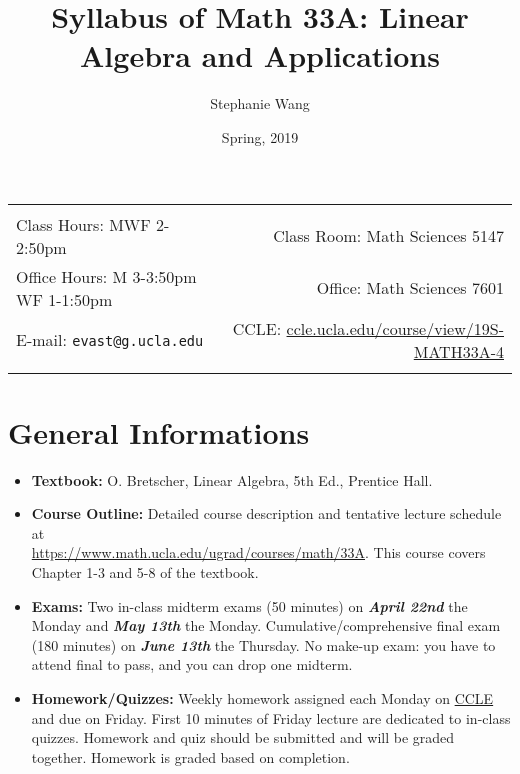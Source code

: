 \documentclass[11pt]{article}
\title{Syllabus of Math 33A: Linear Algebra and Applications}
\author{Stephanie Wang}
\date{Spring, 2019}
\begin{document}
\maketitle

\begin{tabular*}{.93\textwidth}{@{\extracolsep{\fill}}lr}


\hline
 & \\
 Class Hours: MWF 2-2:50pm & Class Room: Math Sciences 5147 \\
 Office Hours: M 3-3:50pm WF 1-1:50pm  &  Office: Math Sciences 7601 \\
 E-mail: \texttt{evast@g.ucla.edu} & CCLE: \href{https://ccle.ucla.edu/course/view/19S-MATH33A-4}{ccle.ucla.edu/course/view/19S-MATH33A-4}\\ 
 & \\
\hline
\end{tabular*}

\vspace{5 mm}


\section*{General Informations}
\begin{itemize}
  \item {\bf Textbook:} O. Bretscher, Linear Algebra, 5th Ed., Prentice Hall.
  \item {\bf Course Outline:} Detailed course description and tentative lecture schedule at \\ \href{https://www.math.ucla.edu/ugrad/courses/math/33A}{https://www.math.ucla.edu/ugrad/courses/math/33A}. This course covers Chapter 1-3 and 5-8 of the textbook.
  \item {\bf Exams:} Two in-class midterm exams (50 minutes) on \textbf{\textit{April 22nd}} the Monday and \textbf{\textit{May 13th}} the Monday. Cumulative/comprehensive final exam (180 minutes) on \textbf{\textit{June 13th}} the Thursday. No make-up exam: you have to attend final to pass, and you can drop one midterm.
  \item {\bf Homework/Quizzes:} Weekly homework assigned each Monday on \href{https://ccle.ucla.edu/course/view/19S-MATH33A-4}{CCLE} and due on Friday. First 10 minutes of Friday lecture are dedicated to in-class quizzes. Homework and quiz should be submitted and will be graded together. Homework is graded based on completion. 

\end{itemize}
\end{document}
